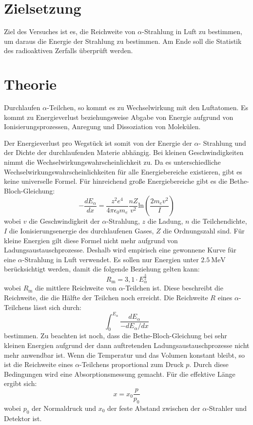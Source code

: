 \section{Zielsetzung}
\label{sec:Zielsetzung}

Ziel des Versuches ist es, die Reichweite von $\alpha$-Strahlung in Luft zu bestimmen, um daraus die Energie der Strahlung zu bestimmen.  Am Ende soll die Statistik des radioaktiven Zerfalls überprüft werden.

\section{Theorie}
\label{sec:Theorie}

Durchlaufen $\alpha$-Teilchen, so kommt es zu Wechselwirkung mit den Luftatomen. Es kommt zu Energieverlust beziehungsweise Abgabe von Energie aufgrund von Ionisierungsprozessen, Anregung und Dissoziation von Molekülen. 

Der Energieverlust pro Wegstück ist somit von der Energie der $\alpha$- Strahlung und der Dichte der durchlaufenden Materie abhängig. Bei kleinen Geschwindigkeiten nimmt die Wechselwirkungswahrscheinlichkeit zu.
Da es unterschiedliche Wechselwirkungswahrscheinlichkeiten für alle Energiebereiche existieren, gibt es keine universelle Formel. Für hinreichend große Energiebereiche gibt es die Bethe-Bloch-Gleichung:
\begin{equation}
-\frac{dE_\alpha}{dx} = \frac{z^2e^4}{4 \pi \epsilon_0 m_e}\frac{nZ}{v^2}\text{ln}\left(\frac{2 m_e v^2}{I}\right)
\end{equation}
wobei $v$ die Geschwindigkeit der $\alpha$-Strahlung, $z$ die Ladung, $n$ die Teilchendichte, $I$ die Ionisierungsenergie des durchlaufenen Gases, $Z$ die Ordnungszahl sind. Für kleine Energien gilt diese Formel nicht mehr aufgrund von Ladungsaustauschprozesse. Deshalb wird empirisch eine gewonnene Kurve für eine $\alpha$-Strahlung in Luft verwendet. Es sollen nur Energien unter $\SI{2,5}{\mega\electronvolt}$ berücksichtigt werden, damit die folgende Beziehung gelten kann:
\begin{equation}
R_\text{m} = 3,1 \cdot E^{\frac{3}{2}}_{\alpha}
\end{equation}
wobei $R_\text{m}$ die mittlere Reichweite von $\alpha$-Teilchen ist. Diese beschreibt die Reichweite, die die Hälfte der Teilchen noch erreicht. Die Reichweite $R$ eines $\alpha$-Teilchens lässt sich durch:
\begin{equation}
\int_0^{E_\alpha} \frac{dE_\alpha}{-dE_\alpha/dx}
\end{equation}
bestimmen. Zu beachten ist noch, dass die Bethe-Bloch-Gleichung bei sehr kleinen Energien aufgrund der dann auftretenden Ladungsaustauschprozesse nicht mehr anwendbar ist.
Wenn die Temperatur und das Volumen konstant bleibt, so ist die Reichweite eines $\alpha$-Teilchens proportional zum Druck $p$. Durch diese Bedingungen wird eine Absorptionsmessung gemacht. Für die effektive Länge ergibt sich:
\begin{equation}
x = x_0 \frac{p}{p_0}
\end{equation}
wobei $p_0$ der Normaldruck und $x_0$ der feste Abstand zwischen der $\alpha$-Strahler und Detektor ist. 